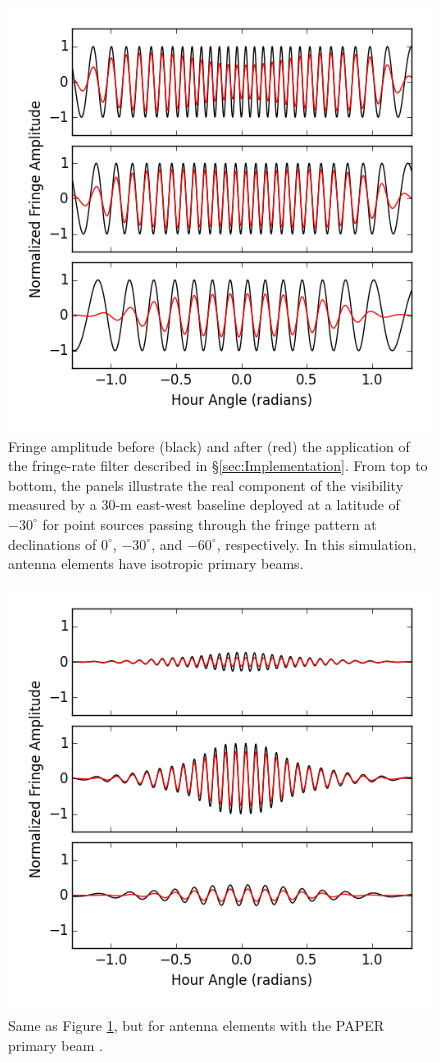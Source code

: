 \documentclass[twocolumn,apj,numberedappendix]{emulateapj}
\begin{document}
\begin{figure}\centering
\includegraphics[width=0.9\columnwidth]{plots/src_track_flat.png}
\caption{
Fringe amplitude before (black) and after (red) the application
of the fringe-rate filter described in \S\ref{sec:Implementation}.  From top to bottom,
the panels illustrate the real component of the visibility measured by
a 30-m east-west baseline deployed at a latitude of $-30^\circ$ 
for point sources 
passing through the fringe pattern at declinations of $0^\circ$,
$-30^\circ$, and $-60^\circ$, respectively.  In this simulation,
antenna elements have isotropic primary beams.
}\label{fig:src_track_flat}
\end{figure}

\begin{figure}\centering
\includegraphics[width=0.9\columnwidth]{plots/src_track_beam.png}
\caption{
Same as Figure \ref{fig:src_track_flat}, but for antenna elements
with the PAPER primary beam \citep{parsons_et_al2010,pober_et_al2012}.
}\label{fig:src_track_beam}
\end{figure}
\end{document}
